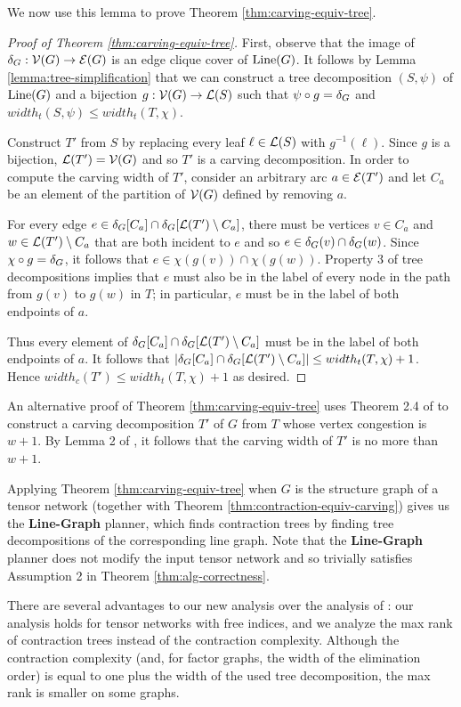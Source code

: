 We now use this lemma to prove Theorem \ref{thm:carving-equiv-tree}.

\begin{proof}[Proof of Theorem \ref{thm:carving-equiv-tree}]
First, observe that the image of $\delta_{G}: \mathcal{V}(G) \rightarrow \mathcal{E}(G)$ is an edge clique cover of $\text{Line}(G)$. It follows by Lemma \ref{lemma:tree-simplification} that we can construct a tree decomposition $(S, \psi)$ of $\text{Line}(G)$ and a bijection $g: \mathcal{V}(G) \rightarrow \mathcal{L}(S)$ such that $\psi \circ g = \delta_{G}$ and $width_t(S, \psi) \leq width_t(T, \chi)$.

Construct $T'$ from $S$ by replacing every leaf $\ell \in \mathcal{L}(S)$ with $g^{-1}(\ell)$. Since $g$ is a bijection, $\mathcal{L}(T') = \mathcal{V}(G)$ and so $T'$ is a carving decomposition. In order to compute the carving width of $T'$, consider an arbitrary arc $a \in \mathcal{E}(T')$ and let $C_a$ be an element of the partition of $\mathcal{V}(G)$ defined by removing $a$. 

For every edge $e \in \delta_{G}[C_a] \cap \delta_{G}[\mathcal{L}(T') \setminus C_a]$, there must be vertices $v \in C_a$ and $w \in \mathcal{L}(T') \setminus C_a$ that are both incident to $e$ and so $e \in \delta_{G}(v) \cap \delta_{G}(w)$. Since $\chi \circ g = \delta_{G}$, it follows that $e \in \chi(g(v)) \cap \chi(g(w))$.  Property 3 of tree decompositions implies that $e$ must also be in the label of every node in the path from $g(v)$ to $g(w)$ in $T$; in particular, $e$ must be in the label of both endpoints of $a$.

Thus every element of $\delta_{G}[C_a] \cap \delta_{G}[\mathcal{L}(T') \setminus C_a]$ must be in the label of both endpoints of $a$. It follows that $|\delta_{G}[C_a] \cap \delta_{G}[\mathcal{L}(T') \setminus C_a]| \leq width_t(T, \chi)+1$. Hence $width_c(T') \leq width_t(T, \chi)+1$ as desired.
\end{proof}

An alternative proof of Theorem \ref{thm:carving-equiv-tree} uses Theorem 2.4 of \cite{HW18} to construct a carving decomposition $T'$ of $G$ from $T$ whose vertex congestion is $w+1$. By Lemma 2 of \cite{ACDJPS07}, it follows that the carving width of $T'$ is no more than $w+1$.

Applying Theorem \ref{thm:carving-equiv-tree} when $G$ is the structure graph of a tensor network (together with Theorem \ref{thm:contraction-equiv-carving}) gives us the \textbf{Line-Graph} planner, which finds contraction trees by finding tree decompositions of the corresponding line graph. Note that the \textbf{Line-Graph} planner does not modify the input tensor network and so trivially satisfies Assumption 2 in Theorem \ref{thm:alg-correctness}.

There are several advantages to our new analysis over the analysis of \cite{MS08}: our analysis holds for tensor networks with free indices, and we analyze the max rank of contraction trees instead of the contraction complexity. Although the contraction complexity (and, for factor graphs, the width of the elimination order) is equal to one plus the width of the used tree decomposition, the max rank is smaller on some graphs.
